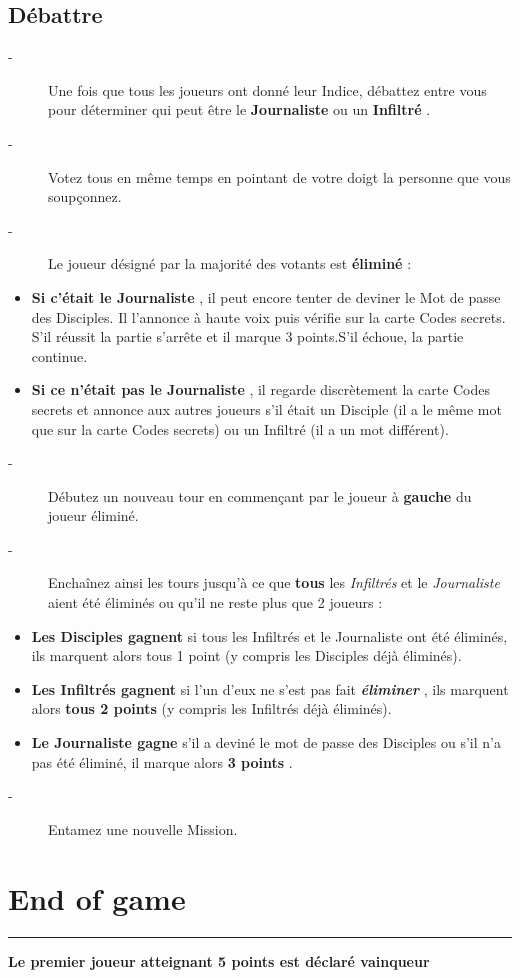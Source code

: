 \documentclass{article}%
\begin{document}
\subsection{ Débattre
}%
\label{subsec:Dbattre}%
\begin{description}%
\item[{-} ]%
%
 Une fois que tous les joueurs ont donné leur Indice, débattez entre vous pour déterminer qui peut être le %
\textbf{Journaliste}%
\textit{ }%
 ou un %
\textbf{Infiltré}%
.
%
\item[{-} ]%
%
 Votez tous en même temps en pointant de votre doigt la personne que vous soupçonnez.
%
\item[{-} ]%
%
 Le joueur désigné par la majorité des votants est %
\textbf{éliminé}%
\textit{ }%
 :
%
\end{description}%
\begin{itemize}%
\item%
%
\textbf{Si c’était le Journaliste}%
, il peut encore tenter de deviner le Mot de passe des Disciples. Il l'annonce à haute voix puis vérifie sur la carte Codes secrets. S’il réussit la partie s’arrête et il marque 3 points.S’il échoue, la partie continue.
%
\item%
%
\textbf{Si ce n’était pas le Journaliste}%
, il regarde discrètement la carte Codes secrets et annonce aux autres joueurs s’il était un Disciple (il a le même mot que sur la carte Codes secrets) ou un Infiltré (il a un mot différent).
%
\end{itemize}%
\begin{description}%
\item[{-} ]%
%
 Débutez un nouveau tour en commençant par le joueur à %
\textbf{gauche}%
\textit{ }%
 du joueur éliminé.
%
\item[{-} ]%
%
 Enchaînez ainsi les tours jusqu’à ce que %
\textbf{tous}%
\textit{ }%
 les %
\textit{Infiltrés}%
\textit{ }%
 et le %
\textit{Journaliste}%
\textit{ }%
 aient été éliminés ou qu’il ne reste plus que 2 joueurs :
%
\end{description}%
\begin{itemize}%
\item%
%
\textbf{Les Disciples gagnent}%
\textit{ }%
 si tous les Infiltrés et le Journaliste ont été éliminés, ils marquent alors tous 1 point (y compris les Disciples déjà éliminés).
%
\item%
%
\textbf{Les Infiltrés gagnent}%
\textit{ }%
 si l'un d'eux ne s'est pas fait %
\textbf{\textit{éliminer}}%
\textit{ }%
 , ils marquent alors %
\textbf{tous 2 points}%
\textit{ }%
 (y compris les Infiltrés déjà éliminés).
%
\item%
%
\textbf{Le Journaliste gagne}%
\textit{ }%
 s'il a deviné le mot de passe des Disciples ou s'il n'a pas été éliminé, il marque alors %
\textbf{3 points}%
.
%
\end{itemize}%
\begin{description}%
\item[{-} ]%
%
 Entamez une nouvelle Mission.
%
\end{description}

%
\section{ End of game
}%
\label{sec:Endofgame}%
\rule{18cm}{0.07cm}\break%
\textbf{Le premier joueur atteignant 5 points est déclaré vainqueur}

%
\end{document}
